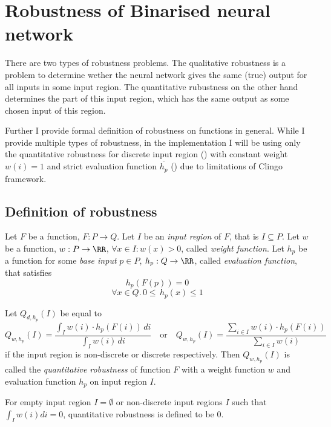 \section{Robustness of Binarised neural network}

There are two types of robustness problems. The qualitative robustness
is a problem to determine wether the neural network gives the same (true)
output for all inputs in some input region. The quantitative rubustness
on the other hand determines the part of this input region, which has
the same output as some chosen input of this region.

Further I provide formal definition of robustness on functions in general.
While I provide multiple types of robustness, in the implementation
I will be using only the quantitative robustness for discrete input region
() with constant weight $w(i) = 1$
and strict evaluation function $\overline{h_p}$ ()
due to limitations of Clingo framework.

\subsection{Definition of robustness}

\begin{definition}\label{def:quantitative_robustness}
    Let $F$ be a function, $F: P \to Q$.
    Let $I$ be an \textit{input region} of $F$, that is $I \subseteq P$.
    Let $w$ be a function, $w: P\to \RR$, $\forall x\in I: w(x) > 0$, called \textit{weight function}.
    Let $h_p$ be a function for some \textit{base input} $p\in P$, $h_p: Q\to \RR$, called \textit{evaluation
    function}, that satisfies
    \begin{equation*}
        h_p(F(p)) = 0
    \end{equation*}
    \begin{equation*}
        \forall x\in Q .\, 0 \leq \, h_p(x) \leq 1 
    \end{equation*}

    \noindent
    Let $Q_{d, h_p}(I)$ be equal to
    \begin{equation*}
        Q_{w, h_p}(I) = \frac{\int_I w(i)\cdot h_p(F(i)) \, di}{\int_I w(i) \, di}
        \hspace{1em} \text{or} \hspace{1em}
        Q_{w, h_p}(I) = \frac{\sum_{i\in I} w(i)\cdot h_p(F(i))}{\sum_{i\in I} w(i)}
    \end{equation*}
    if the input region is non-discrete or discrete respectively.
    Then $Q_{w, h_p}(I)$ is called the \textit{quantitative robustness} of function $F$
    with a weight function $w$ and evaluation function $h_p$ on input region $I$.

    For empty input region $I = \emptyset$
    or non-discrete input regions $I$ such that $\int_I w(i) di = 0$,
    quantitative robustness is defined to be $0$.
\end{definition}

